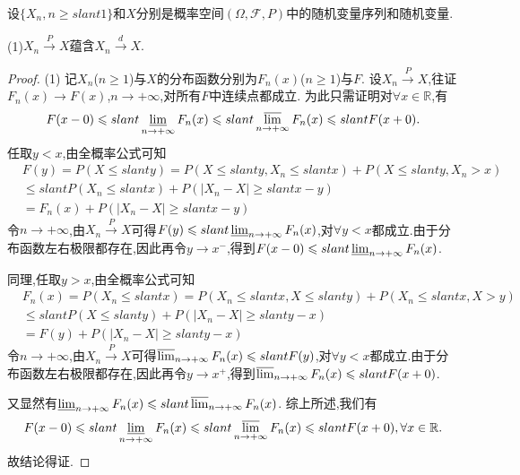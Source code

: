 \documentclass[lang=cn,newtx,10pt,scheme=chinese]{../../Template/elegantbook}
\begin{document}
\begin{theorem}[依概率收敛与依分布收敛的关系]\label{theorem:依概率收敛与依分布收敛的关系}
    设\(\{ X_n, n \geqslant slant 1\}\)和$X$分别是概率空间\((\varOmega, \mathcal{F}, P)\)中的随机变量序列和随机变量.

   (1)$X_n\overset{P}{\rightarrow}X\text{蕴含}X_n\overset{d}{\rightarrow}X.$
    
\end{theorem}
\begin{proof}
    (1)
记\(X_n\)(\(n\geqslant  1\))与\(X\)的分布函数分别为\(F_n(x)\)(\(n\geqslant  1\))与\(F\).
设\(X_n\overset{P}{\rightarrow}X\),往证\(F_n(x) \to F(x)\),\(n \to +\infty\),对所有\(F\)中连续点都成立.
为此只需证明对\(\forall x\in \mathbb{R}\),有
\begin{align*}
    F(x - 0) \leqslant slant \varliminf_{n \to +\infty}F_n(x) \leqslant slant \varlimsup_{n \to +\infty}F_n(x) \leqslant slant F(x + 0).
\end{align*}
任取\(y < x\),由全概率公式可知
\begin{align*}
    &F(y) = P(X\leqslant slant y) = P(X\leqslant slant y, X_n\leqslant slant x) + P(X\leqslant slant y, X_n > x)
    \\
    &\leqslant slant P(X_n\leqslant slant x) + P(|X_n - X|\geqslant slant x - y)
    \\
    &= F_n(x) + P(|X_n - X|\geqslant slant x - y)
\end{align*}
令\(n \to +\infty\),由\(X_n\overset{P}{\rightarrow}X\)可得\(F(y) \leqslant slant \varliminf_{n \to +\infty}F_n(x)\),对\(\forall y < x\)都成立.由于分布函数左右极限都存在,因此再令\(y \to x^-\),得到\(F(x - 0) \leqslant slant \varliminf_{n \to +\infty}F_n(x)\).

同理,任取\(y > x\),由全概率公式可知
\begin{align*}
   &F_n(x) = P(X_n\leqslant slant x) = P(X_n\leqslant slant x, X\leqslant slant y) + P(X_n\leqslant slant x, X > y)
   \\
   &\leqslant slant P(X\leqslant slant y) + P(|X_n - X|\geqslant slant y - x)
   \\
   &= F(y) + P(|X_n - X|\geqslant slant y - x)
\end{align*}
令\(n \to +\infty\),由\(X_n\overset{P}{\rightarrow}X\)可得\(\varlimsup_{n \to +\infty}F_n(x) \leqslant slant F(y)\),对\(\forall y < x\)都成立.由于分布函数左右极限都存在,因此再令\(y \to x^+\),得到\(\varlimsup_{n \to +\infty}F_n(x) \leqslant slant F(x + 0)\).

又显然有\(\varliminf_{n \to +\infty}F_n(x) \leqslant slant \varlimsup_{n \to +\infty}F_n(x)\).
综上所述,我们有
\begin{align*}
  F(x - 0) \leqslant slant \varliminf_{n \to +\infty}F_n(x) \leqslant slant \varlimsup_{n \to +\infty}F_n(x) \leqslant slant F(x + 0),\forall x\in \mathbb{R} .
\end{align*}
故结论得证.
\end{proof}
\end{document}
